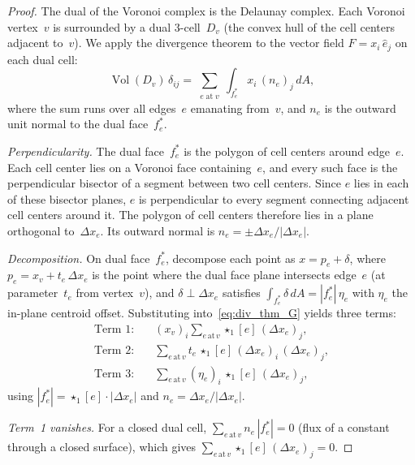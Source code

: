 \documentclass[preprint,12pt]{elsarticle}
\DeclareMathOperator{\Vol}{Vol}
\begin{document}
\begin{proof}
The dual of the Voronoi complex is the Delaunay complex. Each Voronoi
vertex~$v$ is surrounded by a dual 3-cell~$D_v$ (the convex hull of the
cell centers adjacent to~$v$). We apply the divergence theorem to the
vector field $F = x_i\, \hat{e}_j$ on each dual cell:
\begin{equation}
  \Vol(D_v)\, \delta_{ij}
    = \sum_{\substack{e \;\text{at}\; v}} \int_{f^*_e}
      x_i\, (n_e)_j \, dA,
  \label{eq:div_thm_G}
\end{equation}
where the sum runs over all edges~$e$ emanating from~$v$, and $n_e$ is the
outward unit normal to the dual face~$f^*_e$.

\emph{Perpendicularity.}
The dual face~$f^*_e$ is the polygon of cell centers around edge~$e$. Each
cell center lies on a Voronoi face containing~$e$, and every such face is
the perpendicular bisector of a segment between two cell centers. Since $e$
lies in each of these bisector planes, $e$ is perpendicular to every
segment connecting adjacent cell centers around it. The polygon of cell
centers therefore lies in a plane orthogonal to~$\Delta x_e$. Its outward
normal is $n_e = \pm \Delta x_e / |\Delta x_e|$.

\emph{Decomposition.}
On dual face~$f^*_e$, decompose each point as $x = p_e + \delta$, where
$p_e = x_v + t_e\, \Delta x_e$ is the point where the dual face plane
intersects edge~$e$ (at parameter~$t_e$ from vertex~$v$), and
$\delta \perp \Delta x_e$ satisfies $\int_{f^*_e} \delta\, dA
= |f^*_e|\, \eta_e$ with $\eta_e$ the in-plane centroid offset.
Substituting into~\eqref{eq:div_thm_G} yields three terms:
\begin{align}
  \text{Term 1:} &\quad
    (x_v)_i \sum_{e\, \text{at}\, v} \star_1[e]\, (\Delta x_e)_j,
  \label{eq:term1_G} \\
  \text{Term 2:} &\quad
    \sum_{e\, \text{at}\, v} t_e\, \star_1[e]\,
    (\Delta x_e)_i\, (\Delta x_e)_j,
  \label{eq:term2_G} \\
  \text{Term 3:} &\quad
    \sum_{e\, \text{at}\, v} (\eta_e)_i\, \star_1[e]\, (\Delta x_e)_j,
  \label{eq:term3_G}
\end{align}
using $|f^*_e| = \star_1[e] \cdot |\Delta x_e|$ and
$n_e = \Delta x_e / |\Delta x_e|$.

\emph{Term~1 vanishes.}
For a closed dual cell, $\sum_{e\, \text{at}\, v} n_e\, |f^*_e| = 0$
(flux of a constant through a closed surface), which gives
$\sum_{e\, \text{at}\, v} \star_1[e]\, (\Delta x_e)_j = 0$.


\end{proof}
\end{document}

